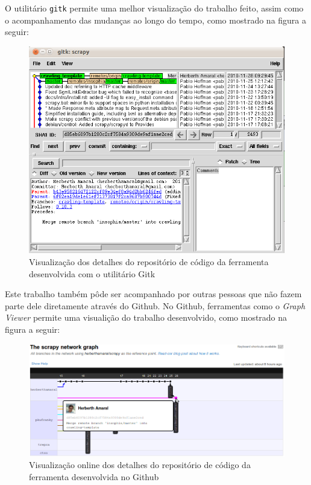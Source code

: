 O utilitário \texttt{gitk} permite uma melhor visualização do trabalho feito, assim como o acompanhamento das mudanças ao longo do tempo, como mostrado na figura a seguir:

\begin{figure} [ht]
	\begin{center}
		\includegraphics[scale=0.5]{gitk.png}
	\end{center}
	\caption{Visualização dos detalhes do repositório de código da ferramenta desenvolvida com o utilitário Gitk}
	\label{gitk}
\end{figure}

\pagebreak
Este trabalho também pôde ser acompanhado por outras pessoas que não fazem parte dele diretamente através do Github. No Github, ferramentas como o \emph{Graph Viewer} permite uma visualição do trabalho desenvolvido, como mostrado na figura a seguir:

\begin{figure} [ht]
	\begin{center}
		\includegraphics[scale=0.5]{github.png}	
	\end{center}
	\caption{Visualização online dos detalhes do repositório de código da ferramenta desenvolvida no Github}
	\label{github}
\end{figure}

